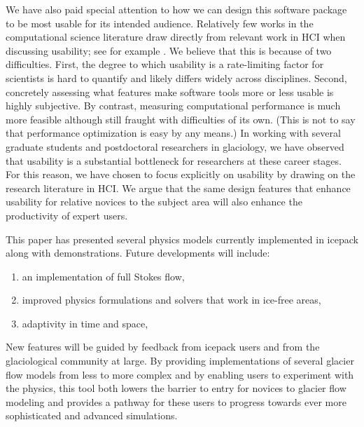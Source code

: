 \documentclass[journal abbreviation, manuscript]{copernicus}
\begin{document}
We have also paid special attention to how we can design this software package to be most usable for its intended audience.
Relatively few works in the computational science literature draw directly from relevant work in HCI when discussing usability; see for example \citet{hannay2009scientists, harris2020array}.
We believe that this is because of two difficulties.
First, the degree to which usability is a rate-limiting factor for scientists is hard to quantify and likely differs widely across disciplines.
Second, concretely assessing what features make software tools more or less usable is highly subjective.
By contrast, measuring computational performance is much more feasible although still fraught with difficulties of its own.
(This is not to say that performance optimization is easy by any means.)
In working with several graduate students and postdoctoral researchers in glaciology, we have observed that usability is a substantial bottleneck for researchers at these career stages.
For this reason, we have chosen to focus explicitly on usability by drawing on the research literature in HCI.
We argue that the same design features that enhance usability for relative novices to the subject area will also enhance the productivity of expert users.

This paper has presented several physics models currently implemented in icepack along with demonstrations.
Future developments will include:
\begin{enumerate}
    \item an implementation of full Stokes flow,
    \item improved physics formulations and solvers that work in ice-free areas,
    \item adaptivity in time and space,
\end{enumerate}
New features will be guided by feedback from icepack users and from the glaciological community at large.
By providing implementations of several glacier flow models from less to more complex and by enabling users to experiment with the physics, this tool both lowers the barrier to entry for novices to glacier flow modeling and provides a pathway for these users to progress towards ever more sophisticated and advanced simulations.


\end{document}
